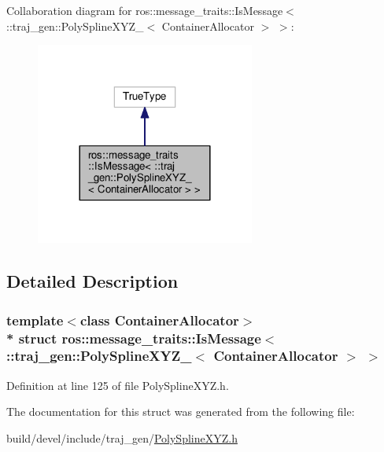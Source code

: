 Collaboration diagram for ros\+:\+:message\+\_\+traits\+:\+:Is\+Message$<$ \+:\+:traj\+\_\+gen\+:\+:Poly\+Spline\+X\+Y\+Z\+\_\+$<$ Container\+Allocator $>$ $>$\+:
\nopagebreak
\begin{figure}[H]
\begin{center}
\leavevmode
\includegraphics[width=204pt]{structros_1_1message__traits_1_1_is_message_3_01_1_1traj__gen_1_1_poly_spline_x_y_z___3_01_conta4ca118213a62d403a38564be91d408a3}
\end{center}
\end{figure}


\subsection{Detailed Description}
\subsubsection*{template$<$class Container\+Allocator$>$\\*
struct ros\+::message\+\_\+traits\+::\+Is\+Message$<$ \+::traj\+\_\+gen\+::\+Poly\+Spline\+X\+Y\+Z\+\_\+$<$ Container\+Allocator $>$ $>$}



Definition at line 125 of file Poly\+Spline\+X\+Y\+Z.\+h.



The documentation for this struct was generated from the following file\+:\begin{DoxyCompactItemize}
\item 
build/devel/include/traj\+\_\+gen/\hyperlink{_poly_spline_x_y_z_8h}{Poly\+Spline\+X\+Y\+Z.\+h}\end{DoxyCompactItemize}
